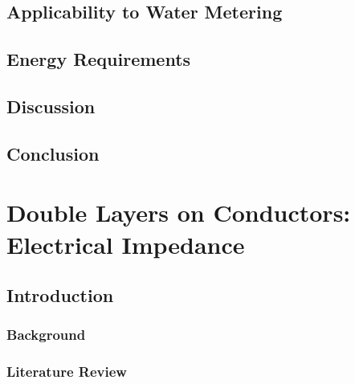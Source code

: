   \chapter{Applicability to Water Metering}
    \label{chap:wirelessWaterMetering}
    

  \chapter{Energy Requirements}
    \label{chap:energyRequirements}
    



  \chapter{Discussion}
  \label{chap:part_1_discussion}

  \chapter{Conclusion}
  \label{chap:part_1_conclusion}


\part{Double Layers on Conductors: Electrical Impedance}
  \label{part:doubleLayersOnConductors}
  \chapter{Introduction}
    \section{Background}
    \section{Literature Review}

